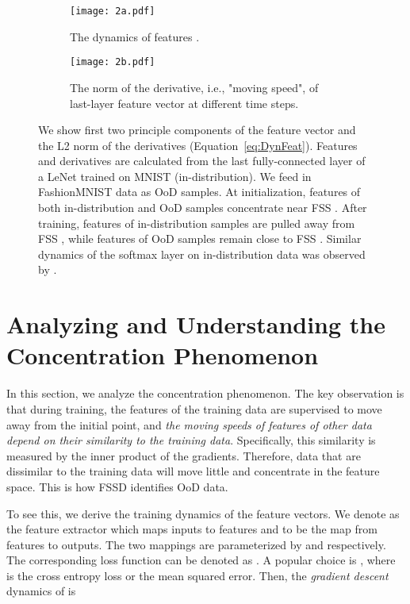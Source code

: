 \documentclass[letterpaper]{article}
\begin{document}
\begin{figure*}[t]
    \centering
    \begin{subfigure}{\textwidth}
    	\centering
         \texttt{[image: 2a.pdf]}
          \caption{The dynamics of features .}
\end{subfigure}
\begin{subfigure}{\textwidth}
    \centering
    \texttt{[image: 2b.pdf]}
    \caption{The norm of the derivative, i.e., "moving speed", of last-layer feature vector  at different time steps. }
\end{subfigure}
     \caption{
     We show first two principle components of the feature vector and the L2 norm of the derivatives (Equation~\eqref{eq:DynFeat}). 
     Features and derivatives are calculated  from the last fully-connected layer of a LeNet trained on MNIST (in-distribution).
We feed in FashionMNIST data as OoD samples.  
    At initialization, features of both in-distribution and OoD samples concentrate near FSS . After training, features of in-distribution samples are pulled away from FSS , while features of OoD samples remain close to FSS . Similar dynamics of the softmax layer on in-distribution data was observed by \cite{grandtour}.
}
\end{figure*}


\section{Analyzing and Understanding the Concentration Phenomenon}

In this section, we analyze the concentration phenomenon. The key observation is that during training, the features of the training data are supervised to move away from the initial point, and \textit{the moving speeds of features of other data depend on their similarity to the training data}. Specifically, this similarity is measured by the inner product of the gradients. Therefore, data that are dissimilar to the training data will move little and concentrate in the feature space. This is how FSSD identifies OoD data.

To see this,  we derive the training dynamics of the feature vectors.
We denote  as the feature extractor which maps inputs to features  and  to be the map from features to outputs. 
The two mappings are parameterized by  and  respectively. 
The corresponding loss function can be denoted as . A popular choice is , where  is the cross entropy loss or the mean squared error. 
Then, 
the \emph{gradient descent} dynamics of  is 
\end{document}
